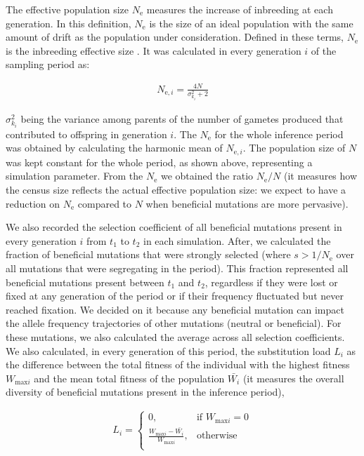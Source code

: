 \documentclass[a4paper, 12pt]{article}
\begin{document}
The effective population size $N_{\mathrm{e}}$ measures the increase of inbreeding at each generation. In this definition, $N_{\mathrm{e}}$ is the size of an ideal population with the same amount of drift as the population under consideration. Defined in these terms, $N_{\mathrm{e}}$ is the inbreeding effective size \citep{Santiago:1995wx, Walsh:2018tv}. It was calculated in every generation $i$ of the sampling period as:

\begin{gather*}
    N_{\mathrm{e},i} = \frac{4N}{\sigma^2_{k_i} + 2} 
\end{gather*}

\noindent $\sigma^2_{k_i}$ being the variance among parents of the number of gametes produced that contributed to offspring in generation $i$. The $N_\mathrm{e}$ for the whole inference period was obtained by calculating the harmonic mean of $N_{\mathrm{e},i}$. The population size of $N$ was kept constant for the whole period, as shown above, representing a simulation parameter. From the $N_\mathrm{e}$ we obtained the ratio $N_\mathrm{e}/N$ (it measures how the census size reflects the actual effective population size: we expect to have a reduction on $N_{\mathrm{e}}$ compared to $N$ when beneficial mutations are more pervasive). 

We also recorded the selection coefficient of all beneficial mutations present in every generation $i$ from $t_1$ to $t_2$ in each simulation. After, we calculated the fraction of beneficial mutations that were strongly selected (where $s > 1/N_{\mathrm{e}}$ over all mutations that were segregating in the period). This fraction represented all beneficial mutations present between $t_1$ and $t_2$, regardless if they were lost or fixed at any generation of the period or if their frequency fluctuated but never reached fixation. We decided on it because any beneficial mutation can impact the allele frequency trajectories of other mutations (neutral or beneficial). For these mutations, we also calculated the average across all selection coefficients. We also calculated, in every generation of this period, the substitution load $L_i$ as the difference between the total fitness of the individual with the highest fitness $W_{\mathrm{max}i}$ and the mean total fitness of the population $\bar{W_{i}}$ (it measures the overall diversity of beneficial mutations present in the inference period),

\begin{gather*}
    L_i = 
\begin{cases}
    0, & \text{if } W_{\mathrm{max}i}=0\\
    \frac{W_{\mathrm{max}i} - \bar{W_{i}}}{W_{\mathrm{max}i}},& \text{otherwise}\\
\end{cases}
\end{gather*}
\end{document}
